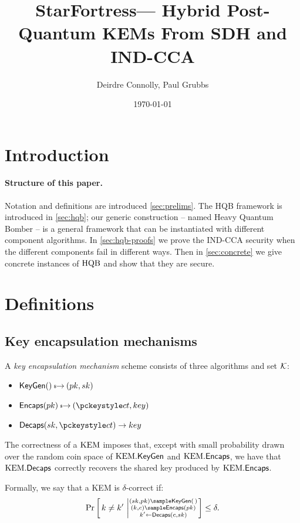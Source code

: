 \documentclass{article}
\title{StarFortress—  Hybrid Post-Quantum KEMs From SDH and IND-CCA}
\author{Deirdre Connolly, Paul Grubbs}
\date{\today}
\begin{document}
\maketitle

\section{Introduction}

\paragraph{Structure of this paper.}
Notation and definitions are introduced \autoref{sec:prelims}.
The HQB framework is introduced in \autoref{sec:hqb}; our generic
construction -- named Heavy Quantum Bomber -- is a general framework
that can be instantiated with different component algorithms.
In \autoref{sec:hqb-proofs} we prove the IND-CCA security when the different
components fail in different ways.
Then in \autoref{sec:concrete} we give concrete instances of $\text{HQB}$
and show that they are secure.

\section{Definitions}\label{sec:prelims}

\subsection{Key encapsulation mechanisms}\label{sec:kems}

\begin{definition}[KEM]\label{def:kem}
    A \emph{key encapsulation mechanism} scheme consists of three algorithms and set $\mathcal{K}$:
    \begin{itemize}
    \item $\keygen() \tor (\pk, \sk)$
    \item $\encaps(\pk) \tor (\ct, \key)$
    \item $\decaps(\sk, \ct) \to \key$
    \end{itemize}
\end{definition}

\begin{definition}[Correctness]\label{sec:kem-correctness}
    The correctness of a $\text{KEM}$ imposes that, except with small probability drawn
    over the random coin space of $\text{KEM}.\textsf{KeyGen}$ and $\text{KEM}.\textsf{Encaps}$, we have that
    $\text{KEM}.\textsf{Decaps}$ correctly recovers the shared key produced by $\text{KEM}.\textsf{Encaps}$.

    Formally, we say that a KEM is $\delta$-correct if:
    \[
        \Pr \left[\,  k \ne k' \, \left | \substack{(\sk, \pk) \sample \keygen(\,) \\ (k, c) \sample \encaps(\pk) \\ k' \gets \decaps(c, \sk) } \right. \right] \le \delta .
    \]
\end{definition}
\end{document}
